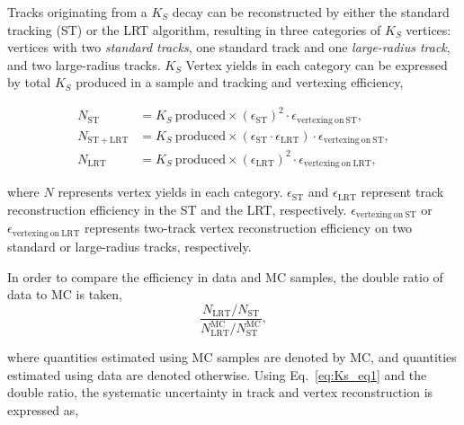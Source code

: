 Tracks originating from a $K_{S}$ decay can be reconstructed by either the standard tracking (ST) or the LRT algorithm, resulting in three categories of $K_{S}$ vertices: vertices with two \textit{standard tracks}, one standard track and one \textit{large-radius track}, and two large-radius tracks. $K_{S}$ Vertex yields in each category can be expressed by total $K_{S}$ produced in a sample and tracking and vertexing efficiency,

\begin{align}
    N_{\mathrm{ST}}  &= K_{S}~\mathrm{produced} \times (\epsilon_{\mathrm{ST}})^{2} \cdot \epsilon_{\mathrm{vertexing~on~ST}}, \nonumber \\
    N_{\mathrm{ST+LRT}}  &= K_{S}~\mathrm{produced} \times (\epsilon_{\mathrm{ST}} \cdot \epsilon_{\mathrm{LRT}}) \cdot \epsilon_{\mathrm{vertexing~on~ST}}, \nonumber \\
    N_{\mathrm{LRT}}&= K_{S}~\mathrm{produced} \times (\epsilon_{\mathrm{LRT}})^{2} \cdot \epsilon_{\mathrm{vertexing~on~LRT}},
\label{eq:Ks_eq1}
\end{align}

where $N$ represents vertex yields in each category. $\epsilon_{\mathrm{ST}}$ and $\epsilon_{\mathrm{LRT}}$ represent track reconstruction efficiency in the ST and the LRT, respectively. $\epsilon_{\mathrm{vertexing~on~ST}}$ or $\epsilon_{\mathrm{vertexing~on~LRT}}$ represents two-track vertex reconstruction efficiency on two standard or large-radius tracks, respectively.

In order to compare the efficiency in data and MC samples, the double ratio of data to MC is taken,
\begin{equation}
\dfrac{N_{\mathrm{LRT}} / N_{\mathrm{ST}}}{N_{\mathrm{LRT}}^{\mathrm{MC}} / N_{\mathrm{ST}}^{\mathrm{MC}}},
\label{eq:Ks_eq2}
\end{equation}

where quantities estimated using MC samples are denoted by MC, and quantities estimated using data are denoted otherwise. Using Eq.~\ref{eq:Ks_eq1} and the double ratio, the systematic uncertainty in track and vertex reconstruction is expressed as,


